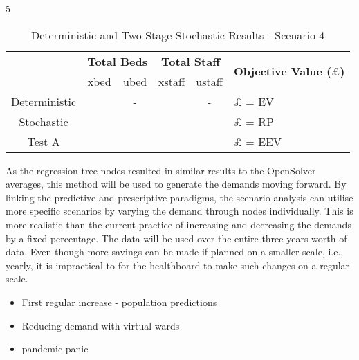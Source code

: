 \documentclass[../thesis.tex]{subfiles}
\begin{document}
5
\begin{table}[h!]
    \centering
    \begin{tabular}{cccccl}\toprule
 & \multicolumn{2}{l}{\textbf{Total Beds}} & \multicolumn{2}{c}{\textbf{Total Staff}} & \multirow{2}{*}{\textbf{Objective Value ($\pounds$)}}\\ \cmidrule(lr){2-3} \cmidrule(lr){4-5}
         
 & xbed           & ubed          & xstaff         & ustaff         \\ \midrule
 Deterministic &   & - &  & - &$\pounds$ = EV \\
 Stochastic &  &  &  &  & $\pounds$ = RP \\
 Test A &  &  &  &  & $\pounds$ = EEV \\\bottomrule
    \end{tabular}
    \caption{Deterministic and Two-Stage Stochastic Results - Scenario 4}
    \label{tab:Scenario4Results}
\end{table}




As the regression tree nodes resulted in similar results to the OpenSolver averages,
this method will be used to generate the demands moving forward. By linking
the predictive and prescriptive paradigms, the scenario analysis can utilise more
specific scenarios by varying the demand through nodes individually. This is more
realistic than the current practice of increasing and decreasing the demands by a
fixed percentage. The data will be used over the entire three years worth of data.
Even though more savings can be made if planned on a smaller scale, i.e., yearly, it
is impractical to for the healthboard to make such changes on a regular scale.


\begin{itemize}
    \item First regular increase - population predictions
    \item Reducing demand with virtual wards
    \item pandemic panic
    
\end{itemize}
\end{document}
